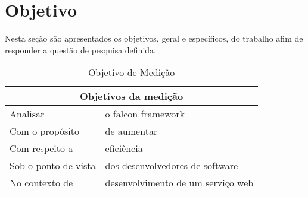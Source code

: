 \chapter{Objetivo}\label{cap2}

Nesta seção são apresentados os objetivos, geral e específicos, do trabalho afim de responder a questão de pesquisa definida.

\begin{table}[H]
\centering
\caption{Objetivo de Medição}
\label{my-label}
\begin{tabular}{ll}
\hline
\multicolumn{2}{c}{Objetivos da medição}                 \\ \hline
Analisar             & o falcon framework                \\
Com o propósito      & de aumentar                       \\
Com respeito a       & eficiência                        \\
Sob o ponto de vista & dos desenvolvedores de software   \\
No contexto de       & desenvolvimento de um serviço web \\ \hline
\end{tabular}
\end{table}
